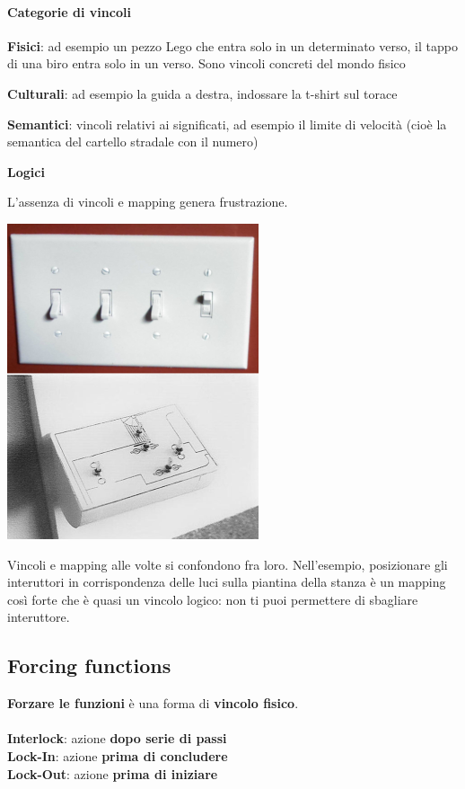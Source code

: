 \documentclass[10pt]{article}
\begin{document}
\paragraph{Categorie di vincoli}
\begin{list}{}{I vincoli che tipicamente si trovano in nelle interfacce si dividono in 4 macrocategorie:}
\item \textbf{Fisici}: ad esempio un pezzo Lego che entra solo in un determinato verso, il tappo di una biro entra solo in un verso. Sono vincoli concreti del mondo fisico
\item \textbf{Culturali}: ad esempio la guida a destra, indossare la t-shirt sul torace
\item \textbf{Semantici}: vincoli relativi ai significati, ad esempio il limite di velocità (cioè la semantica del cartello stradale con il numero)
\item \textbf{Logici}
\end{list}
\pagebreak
L'assenza di vincoli e mapping genera frustrazione.\\
\begin{multicols}{2}
\includegraphics[scale=0.75]{interuttori.png}\\
\columnbreak

Vincoli e mapping alle volte si confondono fra loro. Nell'esempio, posizionare gli interuttori in corrispondenza delle luci sulla piantina della stanza è un mapping così forte che è quasi un vincolo logico: non ti puoi permettere di sbagliare interuttore.
\end{multicols}
\subsection{Forcing functions}
\textbf{Forzare le funzioni} è una forma di \textbf{vincolo fisico}.\\\\
\textbf{Interlock}: azione \textbf{dopo serie di passi}\\
\textbf{Lock-In}: azione \textbf{prima di concludere}\\
\textbf{Lock-Out}: azione \textbf{prima di iniziare}
\end{document}
